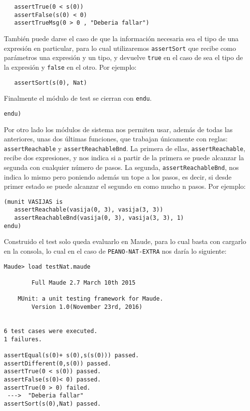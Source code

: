 {\codesize
\begin{verbatim}
   assertTrue(0 < s(0))
   assertFalse(s(0) < 0)
   assertTrueMsg(0 > 0 , "Deberia fallar")
\end{verbatim}
}

También puede darse el caso de que la información necesaria sea el tipo de una expresión en particular, para lo cual utilizaremos \verb"assertSort" que recibe como parámetros una expresión y un tipo, y devuelve \texttt{true} en el caso de sea el tipo de la expresión y \texttt{false} en el otro. Por ejemplo: \par

{\codesize
\begin{verbatim}
   assertSort(s(0), Nat)
\end{verbatim}
} 

Finalmente el módulo de test se cierran con \texttt{endu}. \par

{\codesize
\begin{verbatim}
endu)
\end{verbatim}
}

Por otro lado los módulos de sistema nos permiten usar, además de todas las anteriores, unas dos últimas funciones, que trabajan únicamente con reglas: \verb"assertReachable" y \verb"assertReachableBnd". La primera de ellas, \verb"assertReachable", recibe dos expresiones, y nos indica si a partir de la primera se puede alcanzar la segunda con cualquier número de pasos. La segunda, \verb"assertReachableBnd", nos indica lo mismo pero poniendo además un tope a los pasos, es decir, si desde primer estado se puede alcanzar el segundo en como mucho n pasos. Por ejemplo: \par

{\codesize
\begin{verbatim}
(munit VASIJAS is
   assertReachable(vasija(0, 3), vasija(3, 3))
   assertReachableBnd(vasija(0, 3), vasija(3, 3), 1)
endu)
\end{verbatim}
}

Construido el test solo queda evaluarlo en Maude, para lo cual basta con cargarlo en la consola, lo cual en el caso de \texttt{PEANO-NAT-EXTRA} nos daría lo siguiente:\par

{\codesize
\begin{verbatim}
Maude> load testNat.maude

	    Full Maude 2.7 March 10th 2015

	MUnit: a unit testing framework for Maude.
		Version 1.0(November 23rd, 2016)


6 test cases were executed.
1 failures.

assertEqual(s(0)+ s(0),s(s(0))) passed.
assertDifferent(0,s(0)) passed.
assertTrue(0 < s(0)) passed.
assertFalse(s(0)< 0) passed.
assertTrue(0 > 0) failed.
 --->  "Deberia fallar"
assertSort(s(0),Nat) passed.
\end{verbatim}
}

